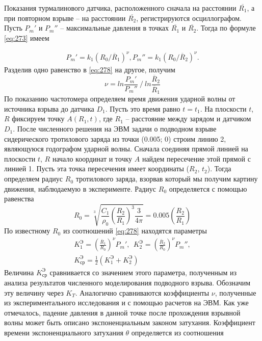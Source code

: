 \documentclass[specialist, subf, href, colorlinks=true, 14pt, final]{disser}
\theoremstyle{definition}
\begin{document}
Показания турмалинового датчика, расположенного сначала на расстоянии $\overline{R_1}$, а при повторном взрыве -- на расстоянии $\overline{R_2}$, регистрируются осциллографом. Пусть $P_{m}'$ и $P_{m}''$ -- максимальные давления в точках $\overline{R_1}$ и $\overline{R_2}$. Тогда по формуле \eqref{eq:273} имеем
\addtocounter{equation}{1}
\begin{equation}\label{eq:278}
  \begin{aligned}
  P_{m}' = k_{1}(R_{0}/\overline{R}_{1})^{\nu},
  P_{m}'' = k_{1}(R_{0}/\overline{R}_{2})^{\nu}.
  \end{aligned}
  \tag{8}
\end{equation}
Разделив одно равенство в \eqref{eq:278} на другое, получим
\[
  \nu = ln \frac{P_{m}'}{P_{m}''}\ /\ ln \frac{\overline{R}_2}{\overline{R}_1}
\]
По показанию частотомера определяем время движения ударной волны от источника взрыва до датчика $D_1$. Пусть это время равно $t = t_1$. На плоскости $t$, $R$ фиксируем точку $A(R_{1},t)$, где $R_1$ -- расстояние между зарядом и датчиком $D_1$. После численного решения на ЭВМ задачи о подводном взрыве сидерического тротилового заряда из точки (0.005; 0) строим линию 2, являющуюся годографом ударной волны. Сначала соединяя прямой линией на плоскости $t$, $R$ начало координат и точку $A$ найдем пересечение этой прямой с линией 1. Пусть эта точка пересечения имеет координаты ($R_2$, $t_2$). Тогда определяем радиус $R_0$ тротилового заряда, взорвав который мы получим картину движения, наблюдаемую в эксперименте. Радиус $R_0$ определяется с помощью равенства
\[
  R_{0} = \sqrt[3]{\frac{C_1}{\rho_0}\left(\frac{R_2}{R_1}\right)^{3}\frac{3}{4\pi}} = 0.005 \left(\frac{R_2}{R_1}\right)
\]
По известному $R_0$ из соотношений \eqref{eq:278} находятся параметры
\[
  \begin{aligned}
  K_{1}^{\text{Э}} = \left(\frac{\overline{R}_1}{R_0}\right)^{\nu}P_{m}',\ \ K_{2}^{\text{Э}} = \left(\frac{\overline{R}_2}{R_0}\right)^{\nu}P_{m}'',\\
  K_{\text{ср}}^{\text{Э}} = \frac{1}{2}(K_{1}^{\text{Э}} + K_{2}^{\text{Э}})
  \end{aligned}
\]
Величина $K_{\text{ср}}^{\text{Э}}$ сравнивается со значением этого параметра, полученным из анализа результатов численного моделирования подводного взрыва. Обозначим эту величину через $K_T$. Аналогично сравниваются коэффициенты $\nu$, полученные из экспериментального исследования и с помощью расчетов на ЭВМ. Как уже отмечалось, падение давления в данной точке после прохождения взрывной волны может быть описано экспоненциальным законом затухания. Коэффициент времени экспоненциального затухания $\theta$ определяется из соотношения
\end{document}

